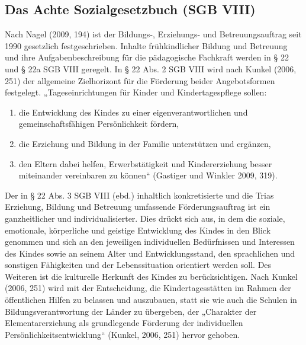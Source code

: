 \subsection{Das Achte Sozialgesetzbuch (SGB VIII)}\label{kap:AchtesSGB}

Nach Nagel (2009, 194) ist der Bildungs-, Erziehungs- und Betreuungsauftrag seit 1990 gesetzlich festgeschrieben. Inhalte frühkindlicher Bildung und Betreuung und ihre Aufgabenbeschreibung für die pädagogische Fachkraft werden in § 22 und § 22a SGB VIII geregelt. 
In § 22 Abs. 2 SGB VIII wird nach Kunkel (2006, 251) der allgemeine Zielhorizont für die Förderung beider Angebotsformen festgelegt. 
„Tageseinrichtungen für Kinder und Kindertagespflege sollen:

\begin{enumerate}
\item die Entwicklung des Kindes zu einer eigenverantwortlichen und gemeinschaftsfähigen Persönlichkeit fördern,
\item die Erziehung und Bildung in der Familie unterstützen und ergänzen,
\item den Eltern dabei helfen, Erwerbstätigkeit und Kindererziehung besser miteinander vereinbaren zu können“ (Gastiger und Winkler 2009, 319).  
\end{enumerate}

Der in § 22 Abs. 3 SGB VIII (ebd.) inhaltlich konkretisierte und die Trias Erziehung, Bildung und Betreuung umfassende Förderungsauftrag ist ein ganzheitlicher und individualisierter. Dies drückt sich aus, in dem die soziale, emotionale, körperliche und geistige Entwicklung des Kindes in den Blick genommen und sich an den jeweiligen individuellen Bedürfnissen und Interessen des Kindes sowie an seinem Alter und Entwicklungsstand, den sprachlichen und sonstigen Fähigkeiten und der Lebenssituation orientiert werden soll. Des Weiteren ist die kulturelle Herkunft des Kindes zu berücksichtigen. Nach Kunkel (2006, 251) wird mit der Entscheidung, die Kindertagesstätten im Rahmen der öffentlichen Hilfen zu belassen und auszubauen, statt sie wie auch die Schulen in Bildungsverantwortung der Länder zu übergeben, der „Charakter der Elementarerziehung als grundlegende Förderung der individuellen Persönlichkeitsentwicklung“ (Kunkel, 2006, 251) hervor gehoben. 

